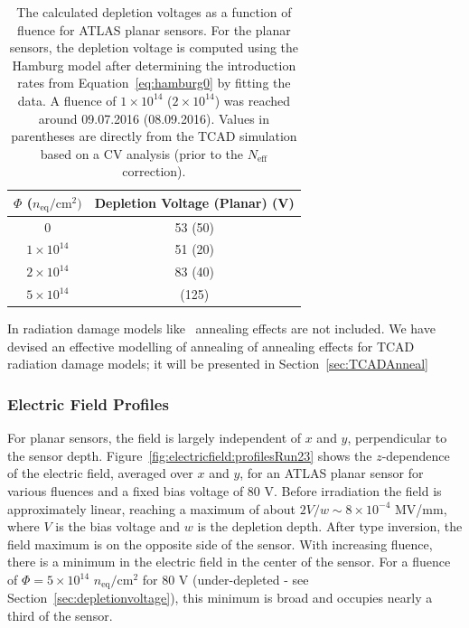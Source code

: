 \begin{table}[!htpb]
\caption{The calculated depletion voltages as a function of fluence for ATLAS planar  sensors.  For the planar sensors, the depletion voltage is computed using the Hamburg model after determining the introduction rates from Equation~\ref{eq:hamburg0} by fitting the data.  A fluence of $1\times 10^{14}$ ($2\times 10^{14}$) was reached around 09.07.2016 (08.09.2016).   Values in parentheses are directly from the TCAD simulation based on a CV analysis (prior to the $N_\text{eff}$ correction).}
\label{eq:depletionvoltage}
\centering
\begin{tabular}{cc}
  \hline
   $\Phi$ ($n_\text{eq}/\text{cm}^2)$ & Depletion Voltage (Planar) (V)	\\
   \hline
   \hline	
0 & 53 (50) \\
$1\times 10^{14}$ & 51 (20) \\
$2\times 10^{14}$& 83 (40) \\
$5\times 10^{14}$& (125) \\
  \hline  
\end{tabular}
\end{table}

In  radiation damage models like~\cite{bib:DP,CHIOCHIA2006} annealing effects are not included. 
We have devised an effective modelling of annealing of annealing effects for TCAD radiation 
damage models; it will be presented in Section~\ref{sec:TCADAnneal} 

\subsubsection{Electric Field Profiles}
\label{sec:Efieldprofile}

For planar sensors, the field is largely independent of $x$ and $y$, perpendicular to the sensor depth. Figure~\ref{fig:electricfield:profilesRun23} shows the $z$-dependence of the electric field, averaged over $x$ and $y$, for an ATLAS planar sensor for various fluences and a fixed bias voltage of 80 V.  Before irradiation the field is approximately linear, reaching a maximum of about $2V/w\sim 8\times 10^{-4}$ MV/mm, where $V$ is the bias voltage and $w$ is the depletion depth.  After type inversion, the field maximum is on the opposite side of the sensor.  With increasing fluence, there is a minimum in the electric field in the center of the sensor.  For a fluence of $\Phi=5\times 10^{14}$ $n_\text{eq}/\text{cm}^2$ for 80 V (under-depleted - see Section~\ref{sec:depletionvoltage}), this minimum is broad and occupies nearly a third of the sensor.



